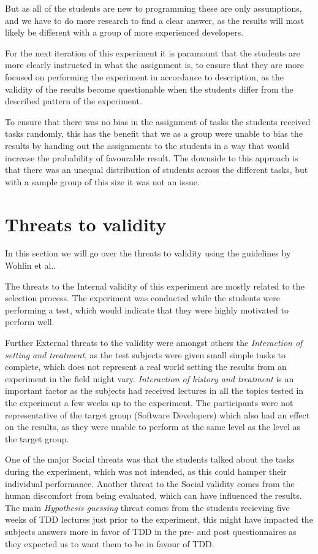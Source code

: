 \documentclass{sig-alternate-05-2015}
\begin{document}
But as all of the students are new to programming these are only assumptions, and we have to do more research to find a clear answer, as the results will most likely be different with a group of more experienced developers.

For the next iteration of this experiment it is paramount that the students are more clearly instructed in what the assignment is, to ensure that they are more focused on performing the experiment in accordance to description, as the validity of the results become questionable when the students differ from the described pattern of the experiment. 

To ensure that there was no bias in the assignment of tasks the students received tasks randomly, this has the benefit that we as a group were unable to bias the results by handing out the assignments to the students in a way that would increase the probability of favourable result. The downside to this approach is that there was an unequal distribution of students across the different tasks, but with a sample group of this size it was not an issue.


\section{Threats to validity}
\label{sec:Threats to validity}
In this section we will go over the threats to validity using the guidelines by Wohlin et al.\cite{wohlin1}.

The threats to the Internal validity of this experiment are mostly related to the selection process. The experiment was conducted while the students were performing a test, which would indicate that they were highly motivated to perform well.

Further External threats to the validity were amongst others the \textit{Interaction of setting and treatment}, as the test subjects were given small simple tasks to complete, which does not represent a real world setting the results from an experiment in the field might vary. \textit{Interaction of history and treatment} is an important factor as the subjects had received lectures in all the topics tested in the experiment a few weeks up to the experiment. The participants were not representative of the target group (Software Developers) which also had an effect on the results, as they were unable to perform at the same level as the level as the target group.

One of the major Social threats was that the students talked about the tasks during the experiment, which was not intended, as this could hamper their individual performance. Another threat to the Social validity comes from the human discomfort from being evaluated\cite{henchy1}, which can have influenced the results. The main \textit{Hypothesis guessing} threat comes from the students recieving five  weeks of TDD lectures just prior to the experiment, this might have impacted the subjects answers more in favor of TDD in the pre- and post questionnaires as they expected us to want them to be in favour of TDD. 
\end{document}
